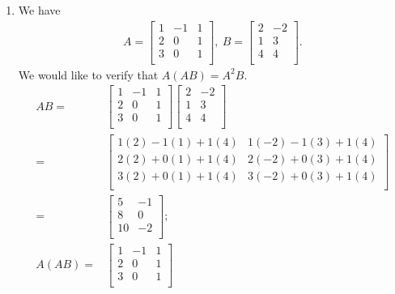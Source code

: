 \documentclass[12pt]{article}
\begin{document}
\begin{enumerate}
  \item
    We have
    \begin{align*}
      A =
      \begin{bmatrix}
        1 & -1 & 1\\
        2 &  0 & 1\\
        3 &  0 & 1\\
      \end{bmatrix},\
      B =
      \begin{bmatrix}
        2 & -2\\
        1 &  3\\
        4 &  4\\
      \end{bmatrix}.
    \end{align*}
    We would like to verify that $A(AB) = A^{2}B$.
    \begin{align*}
      AB =&
      \begin{bmatrix}
        1 & -1 & 1\\
        2 &  0 & 1\\
        3 &  0 & 1\\
      \end{bmatrix}
      \begin{bmatrix}
        2 & -2\\
        1 &  3\\
        4 &  4\\
      \end{bmatrix}\\
      =&
      \begin{bmatrix}
        1(2) - 1(1) + 1(4) & 1(-2) - 1(3) + 1(4)\\
        2(2) + 0(1) + 1(4) & 2(-2) + 0(3) + 1(4)\\
        3(2) + 0(1) + 1(4) & 3(-2) + 0(3) + 1(4)\\
      \end{bmatrix}\\
      =&
      \begin{bmatrix}
        5 & -1\\
        8 & 0\\
        10 & -2\\
      \end{bmatrix};\\
      A(AB) =&
      \begin{bmatrix}
        1 & -1 & 1\\
        2 &  0 & 1\\
        3 &  0 & 1\\

\end{bmatrix}
\end{align*}
\end{enumerate}
\end{document}
